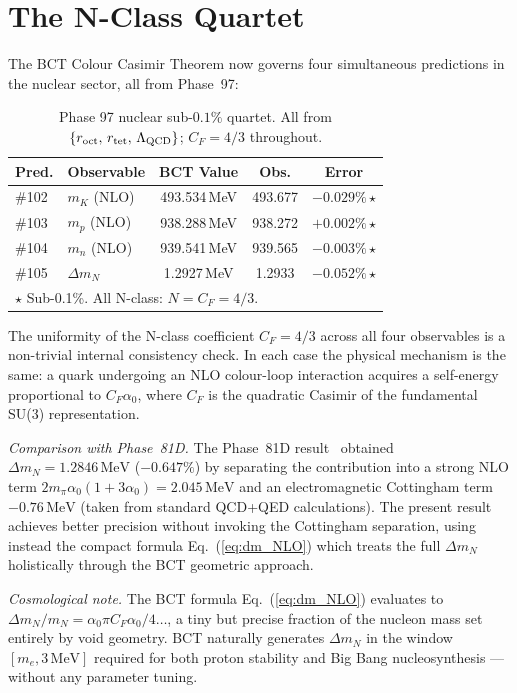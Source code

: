 \documentclass[twocolumn,10pt,a4paper]{article}
\begin{document}
\section{The N-Class Quartet}

The BCT Colour Casimir Theorem now governs four simultaneous predictions
in the nuclear sector, all from Phase~97:

\begin{table}[h]
\centering
\caption{Phase 97 nuclear sub-$0.1\%$ quartet.  All from
  $\{r_{\rm oct},\,r_{\rm tet},\,\Lambda_{\rm QCD}\}$; $C_F = 4/3$ throughout.}
\label{tab:quartet}
\small
\setlength{\tabcolsep}{4pt}
\begin{tabular}{llccc}
\toprule
Pred. & Observable & BCT Value & Obs. & Error \\
\midrule
\#102 & $m_K$ (NLO) & 493.534\,MeV & 493.677 & $-0.029\%$\,$\star$ \\
\#103 & $m_p$ (NLO) & 938.288\,MeV & 938.272 & $+0.002\%$\,$\star$ \\
\#104 & $m_n$ (NLO) & 939.541\,MeV & 939.565 & $-0.003\%$\,$\star$ \\
\#105 & $\Delta m_N$ & 1.2927\,MeV & 1.2933 & $-0.052\%$\,$\star$ \\
\bottomrule
\multicolumn{5}{l}{$\star$ Sub-0.1\%.  \quad All N-class: $N = C_F = 4/3$.}
\end{tabular}
\end{table}

The uniformity of the N-class coefficient $C_F = 4/3$ across all four
observables is a non-trivial internal consistency check.  In each case the
physical mechanism is the same: a quark undergoing an NLO colour-loop
interaction acquires a self-energy proportional to $C_F\alpha_0$, where $C_F$ is
the quadratic Casimir of the fundamental SU(3) representation.

\textit{Comparison with Phase~81D.}\quad
The Phase~81D result~\cite{monograph} obtained $\Delta m_N = 1.2846\,\mathrm{MeV}$
($-0.647\%$) by separating the contribution into a strong NLO term
$2m_\pi\alpha_0(1 + 3\alpha_0) = 2.045\,\mathrm{MeV}$ and an electromagnetic
Cottingham term $-0.76\,\mathrm{MeV}$ (taken from standard QCD+QED
calculations).  The present result
achieves better precision without invoking the Cottingham separation, using
instead the compact formula Eq.~(\ref{eq:dm_NLO}) which treats the full
$\Delta m_N$ holistically through the BCT geometric approach.

\textit{Cosmological note.}\quad
The BCT formula Eq.~(\ref{eq:dm_NLO}) evaluates to $\Delta m_N/m_N =
\alpha_0\pi C_F\alpha_0/4\ldots$, a tiny but precise fraction of the nucleon
mass set entirely by void geometry.  BCT naturally generates $\Delta m_N$
in the window $[m_e, 3\,\mathrm{MeV}]$ required for both proton stability and
Big Bang nucleosynthesis --- without any parameter tuning.
\end{document}
